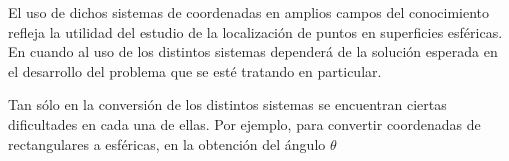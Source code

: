 
El uso de dichos sistemas de coordenadas en amplios campos del conocimiento refleja la utilidad del estudio de la localización de puntos en superficies esféricas. En cuando al uso de los distintos sistemas dependerá de la solución esperada en el desarrollo del problema que se esté tratando en particular.

Tan sólo en la conversión de los distintos sistemas se encuentran ciertas dificultades en cada una de ellas. Por ejemplo, para convertir coordenadas de rectangulares a esféricas, en la obtención del ángulo ${\theta}$
